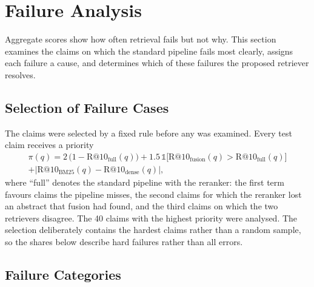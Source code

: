 \section{Failure Analysis}
\label{sec:failures}

Aggregate scores show how often retrieval fails but not why. This section examines the claims on
which the standard pipeline fails most clearly, assigns each failure a cause, and determines
which of these failures the proposed retriever resolves.

\subsection{Selection of Failure Cases}
\label{sec:fail-selection}

The claims were selected by a fixed rule before any was examined. Every test claim receives a
priority
\begin{multline}
\pi(q) = 2\,\bigl(1 - \mathrm{R@10}_{\mathrm{full}}(q)\bigr)
+ 1.5\,\mathbb{1}\bigl[\mathrm{R@10}_{\mathrm{fusion}}(q) > \mathrm{R@10}_{\mathrm{full}}(q)\bigr] \\
+ \bigl|\mathrm{R@10}_{\mathrm{BM25}}(q) - \mathrm{R@10}_{\mathrm{dense}}(q)\bigr|,
\label{eq:priority}
\end{multline}
where ``full'' denotes the standard pipeline with the reranker: the first term favours claims the
pipeline misses, the second claims for which the reranker lost an abstract that fusion had found,
and the third claims on which the two retrievers disagree. The 40 claims with the highest
priority were analysed. The selection deliberately contains the hardest claims rather than a
random sample, so the shares below describe hard failures rather than all errors.

\subsection{Failure Categories}
\label{sec:fail-categories}

